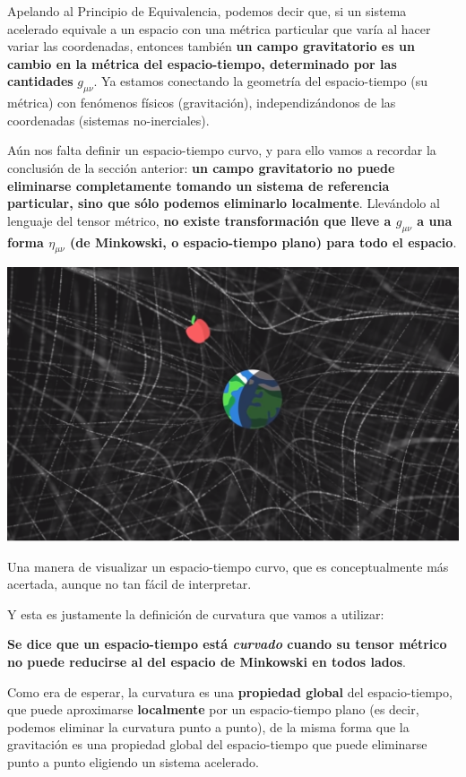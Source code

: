 Apelando al Principio de Equivalencia, podemos decir que, si un sistema acelerado equivale a un espacio con una métrica particular que varía al hacer variar las coordenadas, entonces también \textbf{un campo gravitatorio es un cambio en la métrica del espacio-tiempo, determinado por las cantidades} $g_{\mu\nu}$. Ya estamos conectando la geometría del espacio-tiempo (su métrica) con fenómenos físicos (gravitación), independizándonos de las coordenadas (sistemas no-inerciales).

Aún nos falta definir un espacio-tiempo curvo, y para ello vamos a recordar la conclusión de la sección anterior: \textbf{un campo gravitatorio no puede eliminarse completamente tomando un sistema de referencia particular, sino que sólo podemos eliminarlo localmente}. Llevándolo al lenguaje del tensor métrico, \textbf{no existe transformación que lleve a $g_{\mu\nu}$ a una forma $\eta_{\mu\nu}$ (de Minkowski, o espacio-tiempo plano) para todo el espacio}. 
\begin{marginfigure}
\captionsetup{type=figure}
    \centering
    \includegraphics[width=1.3\textwidth]{Im/curve3d.png}
    \caption{Una manera de visualizar un espacio-tiempo curvo, que es conceptualmente más acertada, aunque no tan fácil de interpretar.}
    \label{fig:sen}
\end{marginfigure}

Y esta es justamente la definición de curvatura que vamos a utilizar\cite[][p.245]{landau2}:
\begin{remarkbox}{}
\textbf{Se dice que un espacio-tiempo está \textit{curvado} cuando su tensor métrico no puede reducirse al del espacio de Minkowski en todos lados}.
\end{remarkbox}
Como era de esperar, la curvatura es una \textbf{propiedad global} del espacio-tiempo, que puede aproximarse \textbf{localmente} por un espacio-tiempo plano (es decir, podemos eliminar la curvatura punto a punto), de la misma forma que la gravitación es una propiedad global del espacio-tiempo que puede eliminarse punto a punto eligiendo un sistema acelerado.

